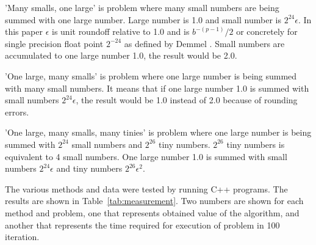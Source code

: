 \documentclass[conference]{IEEEtran}
\begin{document}
\par
'Many smalls, one large' is problem where many small numbers 
are being summed with one large number. 
Large number is 1.0 and small number is $2^{24} \epsilon$.
In this paper $\epsilon$ is unit roundoff relative to 1.0 and 
is $b^{-(p-1)}/2$ or concretely for single precision float point $2^{-24}$ as defined by Demmel \cite{DemmelsEpsilon}.
Small numbers are accumulated to one large number 1.0, the result would be 2.0.
\par
'One large, many smalls' is problem where one large number 
is being summed with many small numbers. It means that
if one large number 1.0 is summed with small 
numbers $2^{24} \epsilon$, the result would be 1.0 instead 
of 2.0 because of rounding errors.
\par
'One large, many smalls, many tinies' is problem where one 
large number is being summed with $2^{24}$ small numbers and $2^{26}$
tiny numbers. 
$2^{26}$ tiny numbers is equivalent to 4 small numbers.
One large number 1.0 is 
summed with small numbers $2^{24} \epsilon$ and tiny 
numbers $2^{26} \epsilon^2$.
\par
The various methods and data were tested by running C++ programs.
The results are shown in Table~\ref{tab:measurement}. 
Two numbers are shown for each method and problem, 
one that represents obtained value of the algorithm,
and another that represents the time required for execution of problem in 100 iteration.
\end{document}
